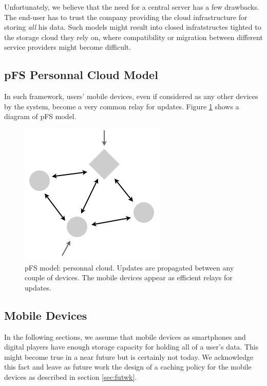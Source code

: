 Unfortunately, we believe that the need for a central server has a few
drawbacks. The end-user has to trust the company providing the cloud
infrastructure for storing \emph{all} his data. Such models might
result into closed infratstructes tighted to the storage cloud
they rely on, where compatibility or migration between different
service providers might become difficult.

\subsection {pFS Personnal Cloud Model}

In such
framework, users' mobile devices, even if considered as any other
devices by the system, become a very common relay for updates. Figure
\ref{PfsModel} shows a diagram of pFS model.

\begin{figure}[ht]
\begin{center}
  \includegraphics [scale=0.4] {img/pfs_model}
  \caption{\label{PfsModel} {\small pFS model: personnal
      cloud. Updates are propagated between any couple of
      devices. The mobile devices appear as efficient relays 
      for updates.}}
\end{center}
\end{figure}




\subsection {Mobile Devices}

In the following sections, we assume that mobile devices as smartphones and
digital players have enough storage capacity for holding all of a
user's data. This might become true in a near future but is certainly
not today. We acknowledge this fact and leave as future work the
design of a caching policy for the mobile devices as described in section 
\ref{sec:futwk}.


